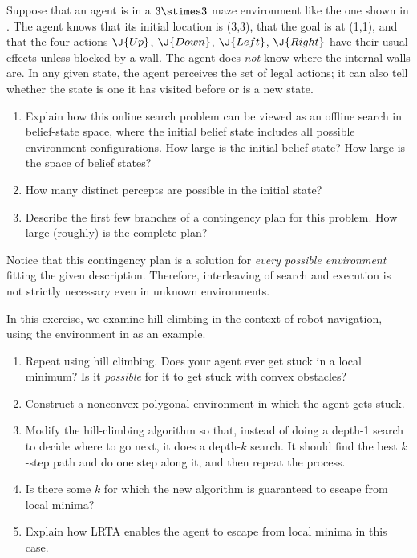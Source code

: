 \begin{iexercise}%
Suppose that an agent is in a \(3\stimes 3\) maze environment like the
one shown in . The agent knows that its initial
location is (3,3), that the goal is at (1,1), and that the four
actions \(\J{Up}\), \(\J{Down}\), \(\J{Left}\), \(\J{Right}\) have their usual effects unless
blocked by a wall. The agent does {\em not} know where the internal walls are.
In any given state, the agent perceives the set of legal actions;
it can also tell whether the state is one it has visited before or is a
new state.
\begin{enumerate}
\item Explain how this online search problem can be viewed
as an offline search in belief-state space,
where the initial belief state includes all possible environment
configurations. How large is the initial belief state? How large is
the space of belief states?  
\item How many distinct percepts are possible in the initial state?
\item Describe the first few branches of a contingency plan for this problem.
How large (roughly) is the complete plan?
\end{enumerate}
Notice that this contingency plan is a solution for {\em every
possible environment} fitting the given description. Therefore,
interleaving of search and execution is not strictly necessary even in
unknown environments.
\end{iexercise} 

\begin{exercise}%
\prgex
In this exercise, we examine hill climbing in the context of
robot navigation, using the environment in
 as an example.
\begin{enumerate}
\item Repeat  using hill climbing.
Does your agent ever get stuck in a local
minimum? Is it {\it possible} for it to get stuck with convex
obstacles? 
\item Construct a nonconvex polygonal environment in which the agent
gets stuck.
\item Modify the hill-climbing algorithm so that, instead of doing a
depth-1 search to decide where to go next, it does a depth-\(k\)
search. It should find the best \(k\)-step path and do one step along
it, and then repeat the process. 
\item Is there some \(k\) for which the new algorithm is
guaranteed to escape from local minima?
\item Explain how LRTA{\star} enables the agent to escape from local minima
in this case.
\end{enumerate}
\end{exercise} 

